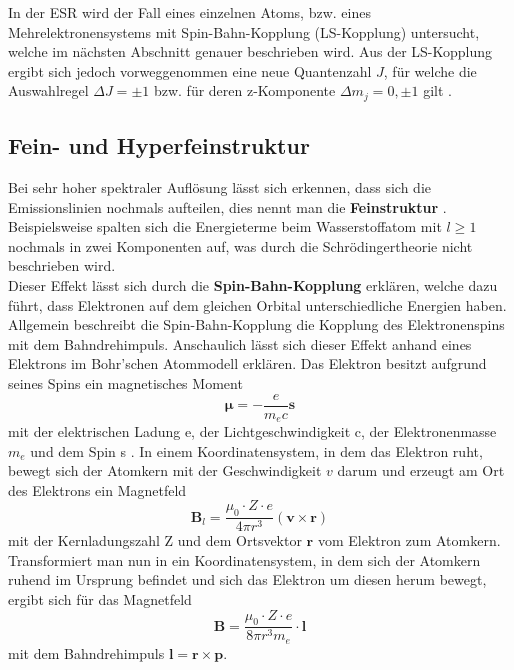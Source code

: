 \documentclass{scrartcl}
\begin{document}
In der ESR wird der Fall eines einzelnen Atoms, bzw. eines Mehrelektronensystems mit Spin-Bahn-Kopplung (LS-Kopplung) untersucht, welche im nächsten Abschnitt genauer beschrieben wird. Aus der LS-Kopplung ergibt sich jedoch vorweggenommen eine neue Quantenzahl $J$, für welche die Auswahlregel $\Delta J = \pm 1$ bzw. für deren z-Komponente $\Delta m_j = 0, \pm 1$ gilt \cite{Grundlagen}.


\subsection{Fein- und Hyperfeinstruktur}
Bei sehr hoher spektraler Auflösung lässt sich erkennen, dass sich die Emissionslinien nochmals aufteilen, dies nennt man die \textbf{Feinstruktur} \cite{Demtroder}. Beispielsweise spalten sich die Energieterme beim Wasserstoffatom mit $l \geqslant 1$ nochmals in zwei Komponenten auf, was durch die Schrödingertheorie nicht beschrieben wird. \\
Dieser Effekt lässt sich durch die \textbf{Spin-Bahn-Kopplung} erklären, welche dazu führt, dass Elektronen auf dem gleichen Orbital unterschiedliche Energien haben. Allgemein beschreibt die Spin-Bahn-Kopplung die Kopplung des Elektronenspins mit dem Bahndrehimpuls. Anschaulich lässt sich dieser Effekt anhand eines Elektrons im Bohr'schen Atommodell erklären. Das Elektron besitzt aufgrund seines Spins ein magnetisches Moment
\begin{equation}
    \pmb{\mu} = - \frac{e}{m_e c} \mathbf{s}
\end{equation}
mit der elektrischen Ladung e, der Lichtgeschwindigkeit c, der Elektronenmasse $m_e$ und dem Spin s \cite{Fliesbach}. In einem Koordinatensystem, in dem das Elektron ruht, bewegt sich der Atomkern mit der Geschwindigkeit $v$ darum und erzeugt am Ort des Elektrons ein Magnetfeld 
\begin{equation}
    \mathbf{B}_l = \frac{\mu_0 \cdot Z \cdot e}{4 \pi r^3} (\mathbf{v} \times \mathbf{r})
\end{equation}
mit der Kernladungszahl Z und dem Ortsvektor $\mathbf{r}$ vom Elektron zum Atomkern. Transformiert man nun in ein Koordinatensystem, in dem sich der Atomkern ruhend im Ursprung befindet und sich das Elektron um diesen herum bewegt, ergibt sich für das Magnetfeld
\begin{equation}
    \mathbf{B} = \frac{\mu_0 \cdot Z \cdot e}{8 \pi r^3 m_e} \cdot \mathbf{l}
\end{equation}
mit dem Bahndrehimpuls $\mathbf{l} = \mathbf{r} \times \mathbf{p}$.
\end{document}
